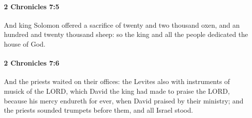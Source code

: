 		\paragraph{2 Chronicles 7:5} %
			\label{2CHRONICLES-7-5}

			And king Solomon offered a sacrifice of twenty and two thousand oxen, and an hundred and twenty thousand sheep: so the king and all the people dedicated the house of God.


		\paragraph{2 Chronicles 7:6} %
			\label{2CHRONICLES-7-6}

			And the priests waited on their offices: the Levites also with instruments of musick of the LORD, which David the king had made to praise the LORD, because his mercy endureth for ever, when David praised by their ministry; and the priests sounded trumpets before them, and all Israel stood.

